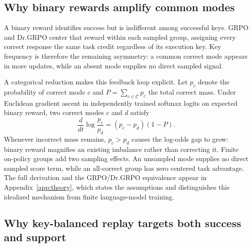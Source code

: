 \subsection{Why binary rewards amplify common modes}
\label{sec:collapse-mechanism}

A binary reward identifies success but is indifferent among successful keys.
GRPO and Dr.GRPO center that reward within each sampled group, assigning every
correct response the same task credit regardless of its execution key. Key
frequency is therefore the remaining asymmetry: a common correct mode appears
in more updates, while an absent mode supplies no direct sampled signal.

A categorical reduction makes this feedback loop explicit. Let $p_c$ denote
the probability of correct mode $c$ and
$P=\sum_{c\in\mathcal C}p_c$ the total correct mass. Under Euclidean gradient
ascent in independently trained softmax logits on expected binary reward,
two correct modes $c$ and $d$ satisfy
\[
  \frac{d}{dt}\log\frac{p_c}{p_d}=(p_c-p_d)(1-P).
\]
Whenever incorrect mass remains, $p_c>p_d$ causes the log-odds gap to grow:
binary reward magnifies an existing imbalance rather than correcting it.
Finite on-policy groups add two sampling effects. An unsampled mode supplies
no direct sampled score term, while an all-correct group has zero centered
task advantage. The
full derivation and the GRPO/Dr.GRPO equivalence appear in
Appendix~\ref{app:theory}, which states the assumptions and distinguishes
this idealized mechanism from finite language-model training.



\subsection{Why key-balanced replay targets both success and support}
\label{app:replay-objective}

